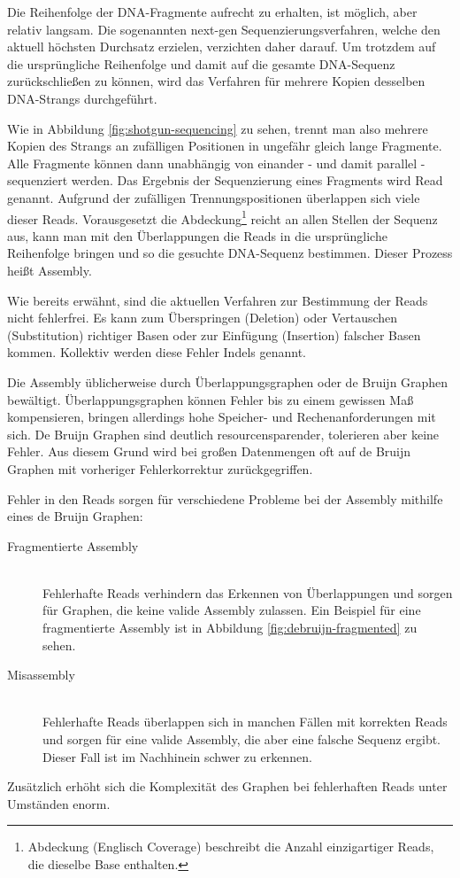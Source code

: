 Die Reihenfolge der DNA-Fragmente aufrecht zu erhalten, ist möglich, aber relativ langsam.
Die sogenannten next-gen Sequenzierungsverfahren, welche den aktuell höchsten Durchsatz erzielen, verzichten daher darauf.
Um trotzdem auf die ursprüngliche Reihenfolge und damit auf die gesamte DNA-Sequenz zurückschließen zu können, wird das Verfahren für mehrere Kopien desselben DNA-Strangs durchgeführt.

Wie in Abbildung \ref{fig:shotgun-sequencing} zu sehen, trennt man also mehrere Kopien des Strangs an zufälligen Positionen in ungefähr gleich lange Fragmente.
Alle Fragmente können dann unabhängig von einander - und damit parallel - sequenziert werden.
Das Ergebnis der Sequenzierung eines Fragments wird Read genannt.
Aufgrund der zufälligen Trennungspositionen überlappen sich viele dieser Reads.
Vorausgesetzt die Abdeckung\footnote{Abdeckung (Englisch Coverage) beschreibt die Anzahl einzigartiger Reads, die dieselbe Base enthalten.}
reicht an allen Stellen der Sequenz aus, kann man mit den Überlappungen die Reads in die ursprüngliche Reihenfolge bringen und so die gesuchte DNA-Sequenz bestimmen.
Dieser Prozess heißt Assembly.

Wie bereits erwähnt, sind die aktuellen Verfahren zur Bestimmung der Reads nicht fehlerfrei.
Es kann zum Überspringen (Deletion) oder Vertauschen (Substitution) richtiger Basen oder zur Einfügung (Insertion) falscher Basen kommen.
Kollektiv werden diese Fehler Indels genannt.

Die Assembly üblicherweise durch Überlappungsgraphen oder de Bruijn Graphen bewältigt.
Überlappungsgraphen können Fehler bis zu einem gewissen Maß kompensieren, bringen allerdings hohe Speicher- und Rechenanforderungen mit sich.
De Bruijn Graphen sind deutlich resourcensparender, tolerieren aber keine Fehler.
Aus diesem Grund wird bei großen Datenmengen oft auf de Bruijn Graphen mit vorheriger Fehlerkorrektur zurückgegriffen.

Fehler in den Reads sorgen für verschiedene Probleme bei der Assembly mithilfe eines de Bruijn Graphen:
\begin{description}
	\item[Fragmentierte Assembly]\hfill \\
		Fehlerhafte Reads verhindern das Erkennen von Überlappungen und sorgen für Graphen, die keine valide Assembly zulassen. Ein Beispiel für eine fragmentierte Assembly ist in Abbildung \ref{fig:debruijn-fragmented} zu sehen.
	\item[Misassembly]\hfill \\
		Fehlerhafte Reads überlappen sich in manchen Fällen mit korrekten Reads und sorgen für eine valide Assembly, die aber eine falsche Sequenz ergibt. \\
		Dieser Fall ist im Nachhinein schwer zu erkennen.
\end{description}
Zusätzlich erhöht sich die Komplexität des Graphen bei fehlerhaften Reads unter Umständen enorm.

